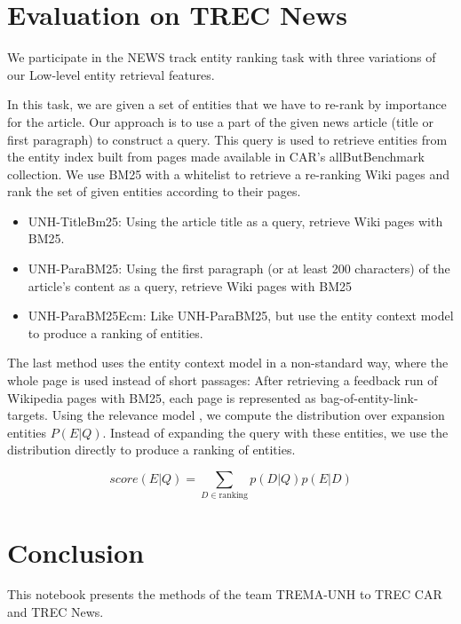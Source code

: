 \documentclass{article}
\begin{document}
\section{Evaluation on TREC News}

We participate in the NEWS track entity ranking task with three variations of our Low-level entity retrieval features.

In this task, we are given a set of entities that we have to re-rank by importance for the article. Our approach is to use a part of the given news article (title or first paragraph) to construct a query. This query is used to retrieve entities from the entity index built from pages made available in CAR's allButBenchmark collection. We use BM25 with a whitelist to retrieve a re-ranking Wiki pages and rank the set of given entities according to their pages.

\begin{itemize}
    \item UNH-TitleBm25: Using the article title as a query, retrieve Wiki pages with BM25.  
    \item UNH-ParaBM25: Using the first paragraph (or at least 200 characters) of the article's content as a query, retrieve Wiki pages with BM25
    \item UNH-ParaBM25Ecm:  Like UNH-ParaBM25, but use the entity context model \cite{dalton2014entity} to produce a ranking of entities.
\end{itemize}

The last method uses the entity context model in a non-standard way, where the whole page is used instead of short passages: After retrieving a feedback run of Wikipedia pages with BM25, each page is represented as bag-of-entity-link-targets. Using the relevance model \cite{lavrenko2017relevance}, we compute the distribution over expansion entities $P(E|Q)$. Instead of expanding the query with these entities, we use the distribution directly to produce a ranking of entities.

$$ score(E|Q)= \sum_{D\in \text{ranking}} p(D|Q) p(E|D)$$



\section{Conclusion}

This notebook presents the methods of the team TREMA-UNH to TREC CAR and TREC News. 





\end{document}
